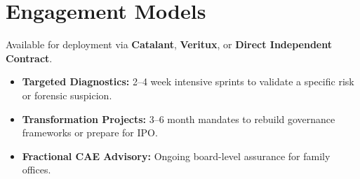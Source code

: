 \documentclass[11pt,a4paper]{article}
\begin{document}
\section*{Engagement Models}
Available for deployment via \textbf{Catalant}, \textbf{Veritux}, or \textbf{Direct Independent Contract}.
\begin{itemize}
    \item \textbf{Targeted Diagnostics:} 2–4 week intensive sprints to validate a specific risk or forensic suspicion.
    \item \textbf{Transformation Projects:} 3–6 month mandates to rebuild governance frameworks or prepare for IPO.
    \item \textbf{Fractional CAE Advisory:} Ongoing board-level assurance for family offices.
\end{itemize}
\end{document}
